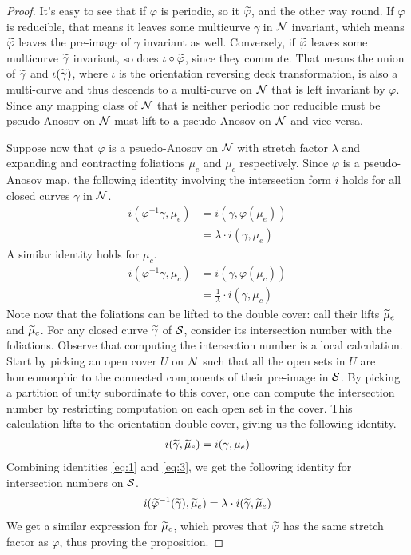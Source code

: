 \begin{proof}
  It's easy to see that if $\varphi$ is periodic, so it $\widetilde{\varphi}$, and the other way round.
  If $\varphi$ is reducible, that means it leaves some multicurve $\gamma$ in $\mathcal{N}$ invariant, which means $\widetilde{\varphi}$ leaves the pre-image of $\gamma$ invariant as well.
  Conversely, if $\widetilde{\varphi}$ leaves some multicurve $\widetilde{\gamma}$ invariant, so does $\iota \circ \widetilde{\varphi}$, since they commute.
  That means the union of $\widetilde{\gamma}$ and $\iota(\widetilde{\gamma})$, where $\iota$ is the orientation reversing deck transformation, is also a multi-curve and thus descends to a multi-curve on $\mathcal{N}$ that is left invariant by $\varphi$.
  Since any mapping class of $\mathcal{N}$ that is neither periodic nor reducible must be pseudo-Anosov on $\mathcal{N}$ must lift to a pseudo-Anosov on $\mathcal{N}$ and vice versa.

  Suppose now that $\varphi$ is a psuedo-Anosov on $\mathcal{N}$ with stretch factor $\lambda$ and expanding and contracting foliations $\mu_e$ and $\mu_c$ respectively.
  Since $\varphi$ is a pseudo-Anosov map, the following identity involving the intersection form $i$ holds for all closed curves $\gamma$ in $\mathcal{N}$.
  \begin{align}
    \label{eq:1}
    i(\varphi^{-1}\gamma, \mu_e) &= i(\gamma, \varphi(\mu_e)) \\
                               &= \lambda \cdot i(\gamma, \mu_e)
  \end{align}
  A similar identity holds for $\mu_c$.
  \begin{align}
    \label{eq:2}
    i(\varphi^{-1}\gamma, \mu_c) &= i(\gamma, \varphi(\mu_c)) \\
                               &= \frac{1}{\lambda} \cdot i(\gamma, \mu_c)
  \end{align}
  Note now that the foliations can be lifted to the double cover: call their lifts $\widetilde{\mu}_e$ and $\widetilde{\mu}_c$.
  For any closed curve $\widetilde{\gamma}$ of $\mathcal{S}$, consider its intersection number with the foliations.
  Observe that computing the intersection number is a local calculation.
  Start by picking an open cover $U$ on $\mathcal{N}$ such that all the open sets in $U$ are homeomorphic to the connected components of their pre-image in $\mathcal{S}$.
  By picking a partition of unity subordinate to this cover, one can compute the intersection number by restricting computation on each open set in the cover.
  This calculation lifts to the orientation double cover, giving us the following identity.
  \begin{align}
    \label{eq:3}
    i(\widetilde{\gamma}, \widetilde{\mu}_e) = i(\gamma, \mu_e)
  \end{align}
  Combining identities \eqref{eq:1} and \eqref{eq:3}, we get the following identity for intersection numbers on $\mathcal{S}$.
  \begin{align*}
    i(\widetilde{\varphi}^{-1} (\widetilde{\gamma}), \widetilde{\mu}_e) = \lambda \cdot i(\widetilde{\gamma}, \widetilde{\mu}_e)
  \end{align*}
  We get a similar expression for $\widetilde{\mu}_c$, which proves that $\widetilde{\varphi}$ has the same stretch factor as $\varphi$, thus proving the proposition.
\end{proof}

